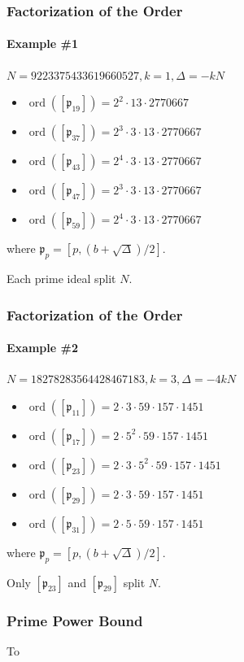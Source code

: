 \documentclass{beamer}
\DeclareMathOperator{\ord}{ord}
\newcommand{\ideal}{\mathfrak}
\newcommand{\idealclass}[1]{\left[ \ideal #1 \right]}
\begin{document}
\begin{frame}
\frametitle{Factorization of the Order}
\framesubtitle{Example \#1}

$N = 9223375433619660527, k = 1, \Delta = -kN$
\begin{itemize}
\item $\ord(\idealclass{p_{19}}) = 2^2 \cdot 13 \cdot 2770667$
\item $\ord(\idealclass{p_{37}}) = 2^3 \cdot 3 \cdot 13 \cdot 2770667$
\item $\ord(\idealclass{p_{43}}) = 2^4 \cdot 3 \cdot 13 \cdot 2770667$
\item $\ord(\idealclass{p_{47}}) = 2^3 \cdot 3 \cdot 13 \cdot 2770667$
\item $\ord(\idealclass{p_{59}}) = 2^4 \cdot 3 \cdot 13 \cdot 2770667$
\end{itemize}

where $\ideal p_p = [p, (b + \sqrt\Delta)/2]$.

\bigskip
Each prime ideal split $N$.

\end{frame}

\begin{frame}
\frametitle{Factorization of the Order}
\framesubtitle{Example \#2}

$N = 18278283564428467183, k = 3, \Delta = -4kN$
\begin{itemize}
\item $\ord(\idealclass{p_{11}}) = 2 \cdot 3 \cdot 59 \cdot 157 \cdot 1451$
\item $\ord(\idealclass{p_{17}}) = 2 \cdot 5^2 \cdot 59 \cdot 157 \cdot 1451$
\item $\ord(\idealclass{p_{23}}) = 2 \cdot 3 \cdot 5^2 \cdot 59 \cdot 157 \cdot 1451$
\item $\ord(\idealclass{p_{29}}) = 2 \cdot 3 \cdot 59 \cdot 157 \cdot 1451$
\item $\ord(\idealclass{p_{31}}) = 2 \cdot 5 \cdot 59 \cdot 157 \cdot 1451$
\end{itemize}

where $\ideal p_p = [p, (b + \sqrt\Delta)/2]$.

\bigskip
Only $\idealclass{p_{23}}$ and $\idealclass{p_{29}}$ split $N$.

\end{frame}

\begin{frame}
\frametitle{Prime Power Bound}
To 

\end{frame}
\end{document}
